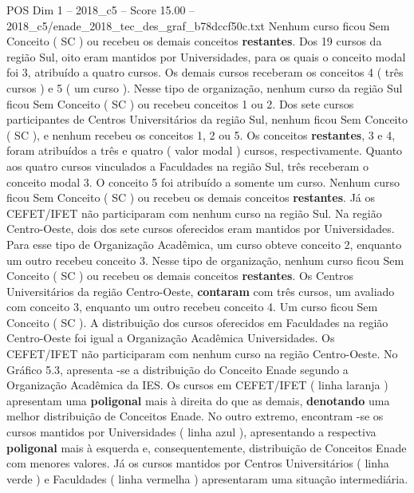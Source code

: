 \begin{textsample}{POS Dim 1 – 2018\_c5 – Score 15.00 – 2018\_c5/enade\_2018\_tec\_des\_graf\_b78dccf50c.txt}
Nenhum curso ficou Sem Conceito ( SC ) ou recebeu os demais conceitos \textbf{restantes}.
Dos 19 cursos da região Sul, oito eram mantidos por Universidades, para os quais o conceito modal foi 3, atribuído a quatro cursos.
Os demais cursos receberam os conceitos 4 ( três cursos ) e 5 ( um curso ).
Nesse tipo de organização, nenhum curso da região Sul ficou Sem Conceito ( SC ) ou recebeu conceitos 1 ou 2.
Dos sete cursos participantes de Centros Universitários da região Sul, nenhum ficou Sem Conceito ( SC ), e nenhum recebeu os conceitos 1, 2 ou 5.
Os conceitos \textbf{restantes}, 3 e 4, foram atribuídos a três e quatro ( valor modal ) cursos, respectivamente.
Quanto aos quatro cursos vinculados a Faculdades na região Sul, três receberam o conceito modal 3.
O conceito 5 foi atribuído a somente um curso.
Nenhum curso ficou Sem Conceito ( SC ) ou recebeu os demais conceitos \textbf{restantes}.
Já os CEFET/IFET não participaram com nenhum curso na região Sul.
Na região Centro-Oeste, dois dos sete cursos oferecidos eram mantidos por Universidades.
Para esse tipo de Organização Acadêmica, um curso obteve conceito 2, enquanto um outro recebeu conceito 3.
Nesse tipo de organização, nenhum curso ficou Sem Conceito ( SC ) ou recebeu os demais conceitos \textbf{restantes}.
Os Centros Universitários da região Centro-Oeste, \textbf{contaram} com três cursos, um avaliado com conceito 3, enquanto um outro recebeu conceito 4.
Um curso ficou Sem Conceito ( SC ).
A distribuição dos cursos oferecidos em Faculdades na região Centro-Oeste foi igual a Organização Acadêmica Universidades.
Os CEFET/IFET não participaram com nenhum curso na região Centro-Oeste.
No Gráfico 5.3, apresenta -se a distribuição do Conceito Enade segundo a Organização Acadêmica da IES.
Os cursos em CEFET/IFET ( linha laranja ) apresentam uma \textbf{poligonal} mais à direita do que as demais, \textbf{denotando} uma melhor distribuição de Conceitos Enade.
No outro extremo, encontram -se os cursos mantidos por Universidades ( linha azul ), apresentando a respectiva \textbf{poligonal} mais à esquerda e, consequentemente, distribuição de Conceitos Enade com menores valores.
Já os cursos mantidos por Centros Universitários ( linha verde ) e Faculdades ( linha vermelha ) apresentaram uma situação intermediária.

\end{textsample}
